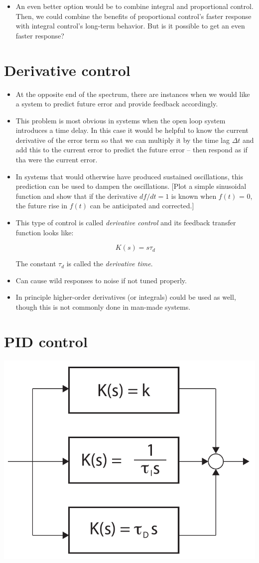 \documentclass{article}
\begin{document}
\begin{itemize}
\item An even better option would be to combine integral and proportional control. Then, we could combine the benefits of proportional control's faster response with integral control's long-term behavior. But is it possible to get an even faster response?

\end{itemize}
\section*{Derivative control}

\begin{itemize}
\item At the opposite end of the spectrum, there are instances when we would like a system to predict future error and provide feedback accordingly.
\item This problem is most obvious in systems when the open loop system introduces a time delay. In this case it would be helpful to know the current derivative of the error term so that we can multiply it by the time lag $\Delta t$ and add this to the current error to predict the future error -- then respond as if tha were the current error.
\item In systems that would otherwise have produced sustained oscillations, this prediction can be used to dampen the oscillations. [Plot a simple sinusoidal function and show that if the derivative $df/dt = 1$ is known when $f(t)$ = 0, the future rise in $f(t)$ can be anticipated and corrected.]
\item This type of control is called \textit{derivative control} and its feedback transfer function looks like:

\[ K(s) = s \tau_d \]

The constant $\tau_d$ is called the \textit{derivative time}.

\item Can cause wild responses to noise if not tuned properly.

\item In principle higher-order derivatives (or integrals) could be used as well, though this is not commonly done in man-made systems.
\end{itemize}

\section*{PID control}

\begin{center}\includegraphics[width=0.5 \textwidth]{pid.pdf}\end{center}
\end{document}
